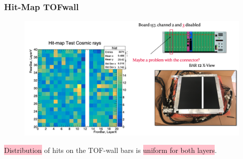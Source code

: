 \begin{frame} [fragile]
    \small
        \frametitle{Hit-Map TOFwall}
                \begin{figure}
                 \centering
                    \includegraphics[scale=0.28]{figures/hit_map.png}
                \end{figure}
            \begin{block}{}
				\colorbox{pink}{Distribution} of hits on the TOF-wall bars is \colorbox{pink}{uniform for both layers}.
			\end{block}
    \end{frame}
